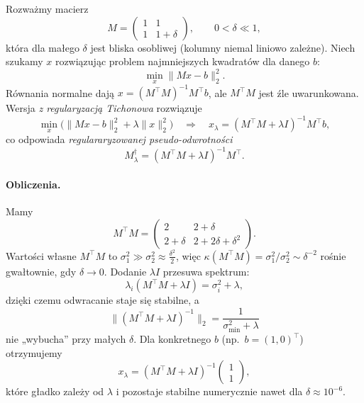 \documentclass[12pt]{article}
\begin{document}
Rozważmy macierz
\[
M=\begin{pmatrix}
1 & 1\\[2pt]
1 & 1+\delta
\end{pmatrix},\qquad 0<\delta\ll 1,
\]
która dla małego $\delta$ jest bliska osobliwej (kolumny niemal liniowo zależne).
Niech szukamy $x$ rozwiązując problem najmniejszych kwadratów dla danego $b$:
\[
\min_x \|Mx-b\|_2^2.
\]
Równania normalne dają $x=(M^\top M)^{-1}M^\top b$, ale $M^\top M$ jest źle
uwarunkowana. Wersja \emph{z regularyzacją Tichonowa} rozwiązuje
\[
\min_x \bigl(\|Mx-b\|_2^2+\lambda\|x\|_2^2\bigr)
\quad\Longrightarrow\quad
x_\lambda=(M^\top M+\lambda I)^{-1}M^\top b,
\]
co odpowiada \emph{regulararyzowanej pseudo-odwrotności}
\[
M_\lambda^{\dagger}=(M^\top M+\lambda I)^{-1}M^\top.
\]

\paragraph{Obliczenia.}
Mamy
\[
M^\top M=\begin{pmatrix}
2 & 2+\delta\\[2pt]
2+\delta & 2+2\delta+\delta^2
\end{pmatrix}.
\]
Wartości własne $M^\top M$ to $\sigma_1^2\gg\sigma_2^2\approx \tfrac{\delta^2}{2}$,
więc $\kappa(M^\top M)=\sigma_1^2/\sigma_2^2\sim \delta^{-2}$ rośnie
gwałtownie, gdy $\delta\to 0$. Dodanie $\lambda I$ przesuwa spektrum:
\[
\lambda_i(M^\top M+\lambda I)=\sigma_i^2+\lambda,
\]
dzięki czemu odwracanie staje się stabilne, a
\[
\| (M^\top M+\lambda I)^{-1} \|_2=\frac{1}{\sigma_{\min}^2+\lambda}
\]
nie „wybucha” przy małych $\delta$. Dla konkretnego $b$ (np.\ $b=(1,0)^\top$)
otrzymujemy
\[
x_\lambda=(M^\top M+\lambda I)^{-1}\!\begin{pmatrix}1\\[2pt]1\end{pmatrix},
\]
które gładko zależy od $\lambda$ i pozostaje stabilne numerycznie nawet dla
$\delta\approx 10^{-6}$.
\end{document}
